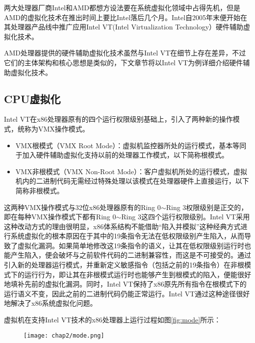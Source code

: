 两大处理器厂商Intel和AMD都想方设法要在系统虚拟化领域中占得先机，但是AMD的虚拟化技术在推出时间上要比Intel落后几个月。Intel自2005年末便开始在其处理器产品线中推广应用Intel VT(Intel Virtualization Technology）硬件辅助虚拟化技术。

AMD处理器提供的硬件辅助虚拟化技术虽然与Intel VT在细节上存在差异，不过它们的主体架构和核心思想是类似的，下文章节将以Intel VT为例详细介绍硬件辅助虚拟化技术。

\subsection{CPU虚拟化}

Intel VT在x86处理器原有的四个运行权限级别基础上，引入了两种新的操作模式，统称为VMX操作模式。

\begin{itemize}
\item VMX根模式（VMX Root Mode）：虚拟机监控器所处的运行模式，基本等同于加入硬件辅助虚拟化支持以前的处理器工作模式，以下简称根模式。
\item VMX非根模式（VMX Non-Root Mode）：客户虚拟机所处的运行模式，虚拟机内的二进制代码无需经过特殊处理以该模式在处理器硬件上直接运行，以下简称非根模式。
\end{itemize}

这两种VMX操作模式与32位x86处理器原有的Ring 0$\sim$Ring 3权限级别是正交的，即在每种VMX操作模式下都有Ring 0$\sim$Ring 3这四个运行权限级别。Intel VT采用这种改动方式的理由很明显，x86体系结构不能借助``陷入并模拟''这种经典方式进行系统虚拟化的根本原因在于其中的19条指令无法在低权限级别产生陷入，从而导致了虚拟化漏洞。如果简单地修改这19条指令的语义，让其在低权限级别运行时也能产生陷入，便会破坏与之前软件代码的二进制兼容性，而这是不可接受的。通过引入新的处理器运行模式，并重新定义敏感指令（包括之前的19条指令）在非根模式下的运行行为，即让其在非根模式运行时也能够产生到根模式的陷入，便能很好地填补先前的虚拟化漏洞。同时，Intel VT保持了x86原先所有指令在根模式下的运行语义不变，因此之前的二进制代码仍能正常运行。Intel VT通过这种途径很好地解决了x86系统虚拟化问题。

虚拟机在支持Intel VT技术的x86处理器上运行过程如图\ref{fig:mode}所示：

\begin{figure}[!htp]
  \centering
  \texttt{[image: chap2/mode.png]}
\end{figure}

